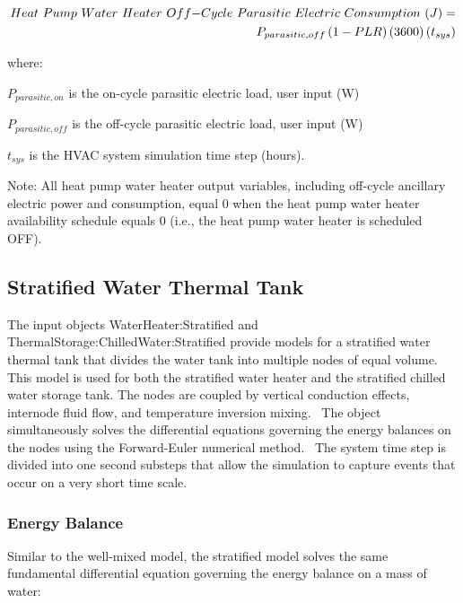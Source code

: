 \begin{equation}
\begin{split}
Heat~Pump~Water~Heater~Off{\rm{ - }}Cycle~Parasitic~Electric~Consumption~(J) = \\{P_{parasitic,off}}\left( {1 - PLR} \right)\left( {3600} \right)\left( {{t_{sys}}} \right)
\end{split}
\end{equation}

where:

\({P_{parasitic,on}}\) is the on-cycle parasitic electric load, user input (W)

\({P_{parasitic,off}}\) is the off-cycle parasitic electric load, user input (W)

\({t_{sys}}\) is the HVAC system simulation time step (hours).

Note: All heat pump water heater output variables, including off-cycle ancillary electric power and consumption, equal 0 when the heat pump water heater availability schedule equals 0 (i.e., the heat pump water heater is scheduled OFF).

\subsection{Stratified Water Thermal Tank}\label{stratified-water-thermal-tank}

The input objects WaterHeater:Stratified and ThermalStorage:ChilledWater:Stratified provide models for a stratified water thermal tank that divides the water tank into multiple nodes of equal volume.~ This model is used for both the stratified water heater and the stratified chilled water storage tank. The nodes are coupled by vertical conduction effects, internode fluid flow, and temperature inversion mixing.~ The object simultaneously solves the differential equations governing the energy balances on the nodes using the Forward-Euler numerical method.~ The system time step is divided into one second substeps that allow the simulation to capture events that occur on a very short time scale.

\subsubsection{Energy Balance}\label{energy-balance-1}

Similar to the well-mixed model, the stratified model solves the same fundamental differential equation governing the energy balance on a mass of water:

